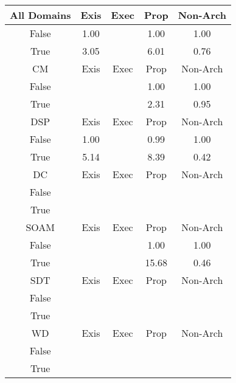 \begin{tabular}{|c||c|c|c|c|}
\hline
All Domains & Exis & Exec & Prop & Non-Arch \\ 
\hline
False & \cellcolor[rgb]{0.9096491753840396,0.8383394301511204,0.41967256369177025} 1.00 &  & \cellcolor[rgb]{0.9091433740777741,0.8359453039681312,0.41920048247258923} 1.00 & \cellcolor[rgb]{0.9099959491243679,0.8399980811641742,0.42} 1.00 \\ 
\hline
True & \cellcolor[rgb]{0.8569181923331844,0.8148559858420348,0.42000000000000004} 3.05 &  & \cellcolor[rgb]{0.7803875088083175,0.7786046094355188,0.41999999999999993} 6.01 & \cellcolor[rgb]{0.8488359481986263,0.5504901548068307,0.36291355165205114} 0.76 \\ 
\hline
\hline
CM & Exis & Exec & Prop & Non-Arch \\ 
\hline
False &  &  & \cellcolor[rgb]{0.9094435169088779,0.8373659800353556,0.4194806157816194} 1.00 & \cellcolor[rgb]{0.909997788342638,0.8399989523728285,0.42} 1.00 \\ 
\hline
True &  &  & \cellcolor[rgb]{0.8761614372581842,0.8239712071222977,0.42} 2.31 & \cellcolor[rgb]{0.8965794759973448,0.7764761863874313,0.40747417759752164} 0.95 \\ 
\hline
\hline
DSP & Exis & Exec & Prop & Non-Arch \\ 
\hline
False & \cellcolor[rgb]{0.9091208865918473,0.8358388632014105,0.4191794941523908} 1.00 &  & \cellcolor[rgb]{0.9084315463316853,0.832575985969977,0.4185361099095729} 0.99 & \cellcolor[rgb]{0.9099876721049119,0.8399941604707477,0.42} 1.00 \\ 
\hline
True & \cellcolor[rgb]{0.8028096864781443,0.7892256409633315,0.42} 5.14 &  & \cellcolor[rgb]{0.7187584162725364,0.7494118813922541,0.42} 8.39 & \cellcolor[rgb]{0.76,0.13,0.28} 0.42 \\ 
\hline
\hline
DC & Exis & Exec & Prop & Non-Arch \\ 
\hline
False &  &  &  &  \\ 
\hline
True &  &  &  &  \\ 
\hline
\hline
SOAM & Exis & Exec & Prop & Non-Arch \\ 
\hline
False &  &  & \cellcolor[rgb]{0.9095908322411725,0.838063272608217,0.4196181100917611} 1.00 & \cellcolor[rgb]{0.9099985004984356,0.8399992897097852,0.42} 1.00 \\ 
\hline
True &  &  & \cellcolor[rgb]{0.53,0.66,0.42} 15.68 & \cellcolor[rgb]{0.7710300803245639,0.18220904686960224,0.2902947416362596} 0.46 \\ 
\hline
\hline
SDT & Exis & Exec & Prop & Non-Arch \\ 
\hline
False &  &  &  &  \\ 
\hline
True &  &  &  &  \\ 
\hline
\hline
WD & Exis & Exec & Prop & Non-Arch \\ 
\hline
False &  &  &  &  \\ 
\hline
True &  &  &  &  \\ 
\hline
\end{tabular}